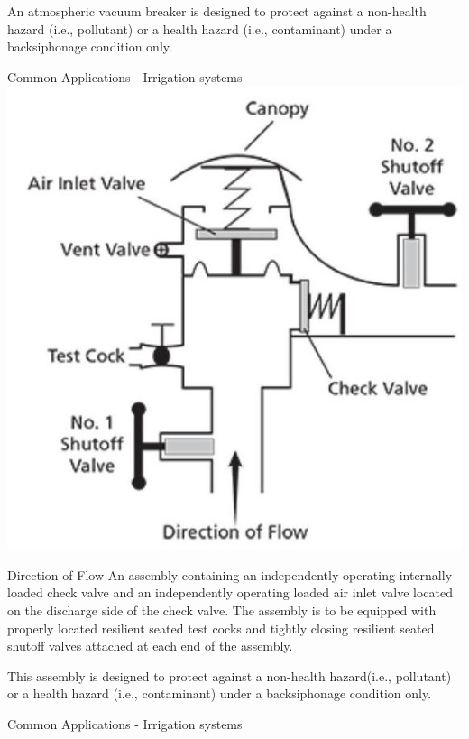\documentclass[10pt]{article}
\begin{document}
An atmospheric vacuum breaker is designed to protect against a non-health hazard (i.e., pollutant) or a health hazard (i.e., contaminant) under a backsiphonage condition only.

Common Applications - Irrigation systems
\newpage
\includegraphics[max width=\textwidth]{PressureVacuumBreaker(2)}

Direction of Flow An assembly containing an independently operating internally loaded check valve and an independently operating loaded air inlet valve located on the discharge side of the check valve. The assembly is to be equipped with properly located resilient seated test cocks and tightly closing resilient seated shutoff valves attached at each end of the assembly.

This assembly is designed to protect against a non-health hazard(i.e., pollutant) or a health hazard (i.e., contaminant) under a backsiphonage condition only.

Common Applications - Irrigation systems
\newpage
\end{document}

